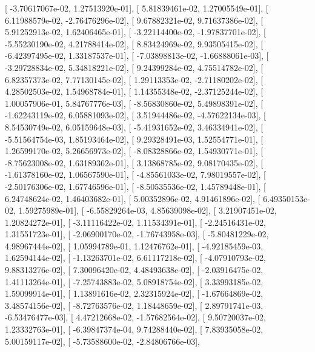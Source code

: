 \documentclass{article}
\begin{document}
       [ -3.70617067e-02,   1.27513920e-01],
       [  5.81839461e-02,   1.27005549e-01],
       [  6.11988579e-02,  -2.76476296e-02],
       [  9.67882321e-02,   9.71637386e-02],
       [  5.91252913e-02,   1.62406465e-01],
       [ -3.22114400e-02,  -1.97837701e-02],
       [ -5.55230190e-02,   4.21788414e-02],
       [  8.83424969e-02,   9.93505415e-02],
       [ -6.42397495e-02,   1.33187537e-01],
       [ -7.03898813e-02,  -1.66888061e-03],
       [ -3.29728834e-02,   5.34818221e-02],
       [  9.24399284e-02,   4.75514782e-02],
       [  6.82357373e-02,   7.77130145e-02],
       [  1.29113353e-02,  -2.71180202e-02],
       [  4.28502503e-02,   1.54968784e-01],
       [  1.14355348e-02,  -2.37125244e-02],
       [  1.00057906e-01,   5.84767776e-03],
       [ -8.56830860e-02,   5.49898391e-02],
       [ -1.62243119e-02,   6.05881093e-02],
       [  3.51944486e-02,  -4.57622134e-03],
       [  8.54530749e-02,   6.05159648e-03],
       [ -5.41931652e-02,   3.46334941e-02],
       [ -5.51564754e-03,   1.85193464e-02],
       [  9.29328491e-03,   1.52554771e-01],
       [  1.26599170e-02,   5.26656973e-02],
       [ -8.08328866e-02,   1.54930771e-01],
       [ -8.75623008e-02,   1.63189362e-01],
       [  3.13868785e-02,   9.08170435e-02],
       [ -1.61378160e-02,   1.06567590e-01],
       [ -4.85561033e-02,   7.98019557e-02],
       [ -2.50176306e-02,   1.67746596e-01],
       [ -8.50535536e-02,   1.45789448e-01],
       [  6.24748624e-02,   1.46403682e-01],
       [  5.00352896e-02,   4.91461896e-02],
       [  6.49350153e-02,   1.59275989e-01],
       [ -6.55829264e-03,   4.85639098e-02],
       [  3.21907451e-02,   1.20824272e-01],
       [ -3.11116422e-02,   1.11534391e-01],
       [ -2.24516431e-02,   1.31551723e-01],
       [ -2.06900170e-02,  -1.76743958e-03],
       [ -5.80481229e-02,   4.98967444e-02],
       [  1.05994789e-01,   1.12476762e-01],
       [ -4.92185459e-03,   1.62594144e-02],
       [ -1.13263701e-02,   6.61117218e-02],
       [ -4.07910793e-02,   9.88313276e-02],
       [  7.30096420e-02,   4.48493638e-02],
       [ -2.03916475e-02,   1.41113264e-01],
       [ -7.25743883e-02,   5.08918754e-02],
       [  3.33993185e-02,   1.59099914e-01],
       [  1.13891616e-02,   2.32315924e-02],
       [ -1.67664869e-02,   3.48574156e-02],
       [ -8.72763576e-02,   1.18448659e-02],
       [  2.89791741e-03,  -6.53476477e-03],
       [  4.47212668e-02,  -1.57682564e-02],
       [  9.50720037e-02,   1.23332763e-01],
       [ -6.39847374e-04,   9.74288440e-02],
       [  7.83935058e-02,   5.00159117e-02],
       [ -5.73588600e-02,  -2.84806766e-03],
\end{document}
